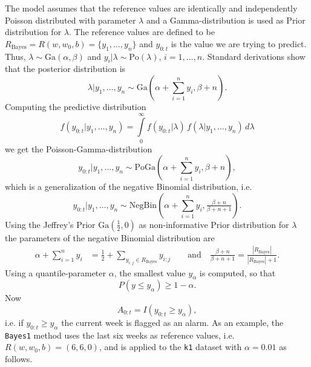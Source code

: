 \documentclass[a4paper,11pt]{article}
\begin{document}
The model assumes that the reference values are identically and
independently Poisson distributed with parameter $\lambda$ and a
Gamma-distribution is used as Prior distribution for $\lambda$.  The
reference values are defined to be $R_{\text{Bayes}}= R(w,w_0,b) =
\{y_1, \ldots, y_{n}\}$ and $y_{0:t}$ is the value we are trying to
predict. Thus, $\lambda \sim \text{Ga}(\alpha, \beta)$ and
$y_i|\lambda \sim \text{Po}(\lambda)$, $i = 1,\ldots,{n}$. Standard
derivations show that the posterior distribution is
\begin{equation*}
\lambda|y_1, \ldots, y_{n} \sim \text{Ga}(\alpha + \sum_{i=1}^{n} y_i, 
\beta + n). 
\end{equation*}
Computing the predictive distribution
\begin{equation*}
f(y_{0:t}|y_1,\ldots,y_{n}) =
\int\limits^\infty_0{f(y_{0:t}|\lambda)\,
f(\lambda|y_1,\ldots,y_{n})}\, d\lambda
\end{equation*}
we get the Poisson-Gamma-distribution
\begin{equation*}
 y_{0:t}|y_1,\ldots,y_{n} \sim 
\text{PoGa}(\alpha + \sum_{i=1}^{n} y_i, \beta + n),
\end{equation*}
which is a generalization of the negative Binomial distribution,
i.e.\ 
\[
y_{0:t}|y_1,\ldots,y_{n} \sim \text{NegBin}(\alpha + \sum_{i=1}^{n}
y_i, \tfrac{\beta + n}{\beta + n + 1}).
\]
Using the Jeffrey's Prior $\text{Ga}(\tfrac{1}{2}, 0)$ as
non-informative Prior distribution for $\lambda$ the parameters of the
negative Binomial distribution are
\begin{align*}
  \alpha + \sum_{i=1}^{n} y_i &= \frac{1}{2} + \sum_{y_{i:j} \in R_{\text{Bayes}}}\!\! y_{i:j} \quad
  \quad\text{and}\quad
  \frac{\beta + n}{\beta + n + 1} = \frac{|R_{\text{Bayes}}|}{|R_{\text{Bayes}}| + 1}.
\end{align*}
Using a quantile-parameter $\alpha$, the smallest value $y_\alpha$ is computed, so that
\begin{equation*}
  P(y \leq y_\alpha) \geq 1-\alpha.
\end{equation*}
Now 
\begin{equation*}
         A_{0:t} = I(y_{0:t} \geq y_\alpha),
\end{equation*}
i.e. if $y_{0:t}\geq y_\alpha$ the current week is flagged as an
alarm. As an example, the \verb+Bayes1+ method uses the last six weeks
as reference values, i.e.\ $R(w,w_0,b)=(6,6,0)$, and is applied to the
\texttt{k1} dataset with $\alpha=0.01$ as follows.
\end{document}
